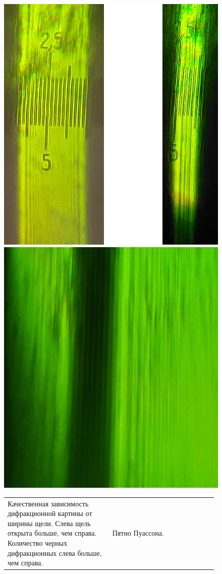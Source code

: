 \begin{figure}[h]
	\begin{minipage}[h]{0.49 \linewidth}
		\centering
		\includegraphics[width=0.8\linewidth]{../Изображения/Качественно Френель размер щели.png}
		\caption{}
		\label{img:Fresnel-diffraction-quality}
	\end{minipage}
	\hfill
	\begin{minipage}[h]{0.49 \linewidth}
		\centering
		\includegraphics[width=0.8\linewidth]{../Изображения/Пятно Пуассона2.png}
		\caption{}
		\label{img:Poisson-spot}
	\end{minipage}
	\begin{tabular}{p{0.49\linewidth}p{0.49\linewidth}}
		Качественная зависимость дифракционной картины от ширины щели. Слева щель открыта больше, чем справа. Количество черных дифракционных слева больше, чем справа. &
		\centering
		Пятно Пуассона. \\
	\end{tabular}
\end{figure}


